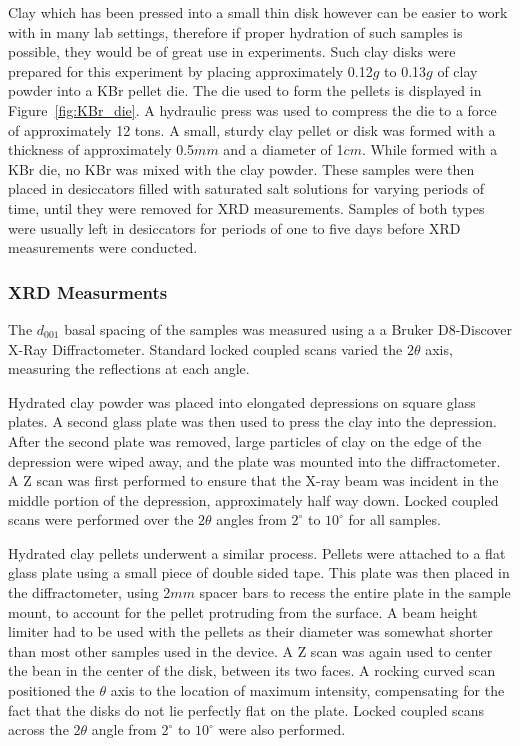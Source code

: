 Clay which has been pressed into a small thin disk however can be easier to work with in many lab settings, therefore if proper hydration of such samples is possible, they would be of great use in experiments. Such clay disks were prepared for this experiment by placing approximately 0.12$g$ to 0.13$g$ of clay powder into a KBr pellet die. The die used to form the pellets is displayed in Figure~\ref{fig:KBr_die}. A hydraulic press was used to compress the die to a force of approximately 12 tons. A small, sturdy clay pellet or disk was formed with a thickness of approximately 0.5$mm$ and a diameter of 1$cm$. While formed with a KBr die, no KBr was mixed with the clay powder. These samples were then placed in desiccators filled with saturated salt solutions for varying periods of time, until they were removed for XRD measurements. Samples of both types were usually left in desiccators for periods of one to five days before XRD measurements were conducted.

\subsubsection{XRD Measurments}
The $d_{001}$ basal spacing of the samples was measured using a a Bruker D8-Discover X-Ray Diffractometer. Standard locked coupled scans varied the $2\theta$ axis, measuring the reflections at each angle.

Hydrated clay powder was placed into elongated depressions on square glass plates. A second glass plate was then used to press the clay into the depression. After the second plate was removed, large particles of clay on the edge of the depression were wiped away, and the plate was mounted into the diffractometer. A Z scan was first performed to ensure that the X-ray beam was incident in the middle portion of the depression, approximately half way down. Locked coupled scans were performed over the  $2\theta$ angles from $2^\circ$ to $10^\circ$ for all samples.

Hydrated clay pellets underwent a similar process. Pellets were attached to a flat glass plate using a small piece of double sided tape. This plate was then placed in the diffractometer, using 2$mm$ spacer bars to recess the entire plate in the sample mount, to account for the pellet protruding from the surface. A beam height limiter had to be used with the pellets as their diameter was somewhat shorter than most other samples used in the device. A Z scan was again used to center the bean in the center of the disk, between its two faces. A rocking curved scan positioned the $\theta$ axis to the location of maximum intensity, compensating for the fact that the disks do not lie perfectly flat on the plate. Locked coupled scans across the $2\theta$ angle from $2^\circ$ to $10^\circ$ were also performed.

